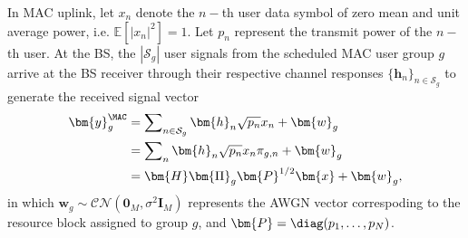 In MAC uplink, let $x_{n}$ denote the $n-$th user data symbol of zero mean and unit average power, i.e. $\mathbb{E}\left[ {|{x_{n}}|^2} \right] = 1$. 
Let $p_n$ represent the transmit power of the $n-$th user.
At the BS, the $|\mathcal{S}_g|$ user signals from the scheduled MAC user group $g$ arrive at the BS receiver through their respective channel responses $\{\bm{h}_n\}_{n\in\mathcal{S}_g}$ to generate the received signal vector
\begin{align}\label{eqn:sig_mac}
	\bm{y}_g^{\MAC}&= \sum\nolimits_{n \in \mathcal{S}_g} \bm{h}_n\sqrt {p_{n}}x_{n}  + \bm{w}_g\nonumber\\
	&=\sum\nolimits_{n} \bm{h}_n\sqrt {p_{n}}x_{n}\pi_{g,n}  + \bm{w}_g\nonumber\\
	&=\bm{H}\bm{\Pi}_g\bm{P}^{1/2}\bm{x} + \bm{w}_g,
\end{align}
in which $\bm{w}_g\sim \mathcal{CN}(\bm{0}_M,\sigma^2 \bm{I}_{M})$ represents the AWGN vector correspoding to the resource block assigned to group $g$, and $\bm{P}=\diag(p_1,\ldots,p_N)$.

